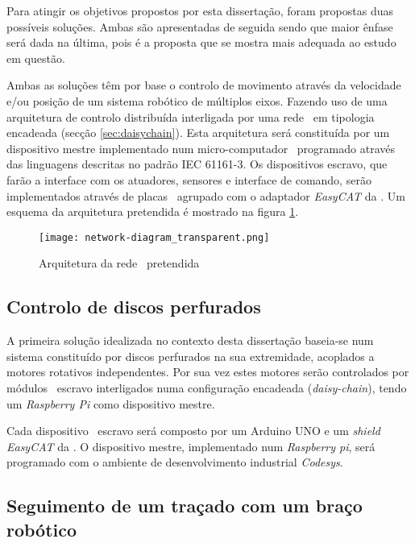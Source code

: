 Para atingir os objetivos propostos por esta dissertação, foram propostas 
duas possíveis soluções. Ambas são apresentadas de seguida sendo que
maior ênfase será dada na última, pois é a proposta que se mostra mais
adequada ao estudo em questão.

Ambas as soluções têm por base o controlo de movimento através da velocidade
e/ou posição de um sistema robótico de múltiplos eixos. Fazendo uso de
uma arquitetura de controlo distribuída interligada por uma rede \ecat\
em tipologia encadeada (secção \ref{sec:daisychain}). Esta arquitetura
será constituída por um dispositivo mestre implementado num micro-computador
\raspi\, programado através das linguagens descritas no padrão
IEC 61161-3. Os dispositivos escravo, que farão a interface com os atuadores,
sensores e interface de comando, serão implementados através de placas
\arduino\ agrupado com o adaptador \emph{EasyCAT} da \cite{ABT:EasyCAT}.
Um esquema da arquitetura pretendida é mostrado na figura
\ref{fig:network-architecture}.

\begin{figure}
 \centering
 \texttt{[image: network-diagram\_transparent.png]}
 \caption{Arquitetura da rede \ecat\ pretendida}
 \label{fig:network-architecture}
\end{figure}



\subsection{Controlo de discos perfurados}

A primeira solução idealizada no contexto desta dissertação baseia-se num
sistema constituído por discos perfurados na sua extremidade, acoplados
a motores rotativos independentes. Por sua vez estes motores serão
controlados por módulos \ecat\ escravo interligados numa configuração
encadeada (\emph{daisy-chain}), tendo um \emph{Raspberry Pi} como dispositivo
mestre.

Cada dispositivo \ecat\ escravo será composto por um Arduino UNO 
\cite[]{arduino:ArduinoUNORev3} e um \emph{shield EasyCAT} da 
\cite{ABT:EasyCAT}. O dispositivo mestre, implementado num \emph{Raspberry
pi}, será programado com o ambiente de desenvolvimento industrial \emph{
Codesys}.

\subsection{Seguimento de um traçado com um braço robótico}


